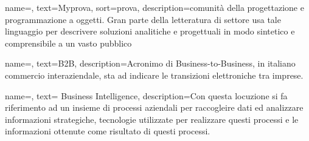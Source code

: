 
\renewcommand{\acronymname}{Acronimi e abbreviazioni}






{
    name=,
    text=Myprova,
    sort=prova,
    description={comunità della progettazione e programmazione a oggetti. Gran parte della letteratura di settore usa tale linguaggio per descrivere soluzioni analitiche e progettuali in modo sintetico e comprensibile a un vasto pubblico}
}


{
    name=,
    text=B2B,
    description={Acronimo di Business-to-Business, in italiano commercio interaziendale, sta ad indicare le transizioni elettroniche tra imprese.}
}

{
    name=,
    text= Business Intelligence,
    description={Con questa locuzione si fa riferimento ad un insieme di processi aziendali per raccogleire dati ed analizzare informazioni strategiche, tecnologie utilizzate per realizzare questi processi e le informazioni ottenute come risultato di questi processi.}
}


